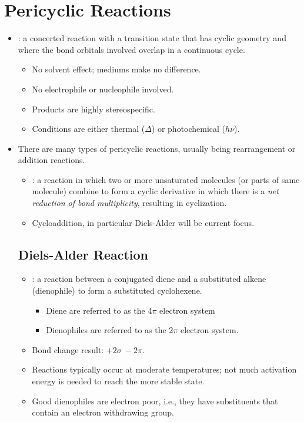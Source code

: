 \section{Pericyclic Reactions}\label{Pericyclic Reactions}
\begin{itemize}
  \item {}: a concerted reaction with a transition state that has cyclic geometry and where the bond orbitals involved overlap in a continuous cycle.
    \begin{itemize}
      \item No solvent effect; mediums make no difference.
      \item No electrophile or nucleophile involved.
      \item Products are highly stereospecific.
      \item Conditions are either thermal (\(\Delta \)) or photochemical (\(h\nu \)).
    \end{itemize}
  \item There are many types of pericyclic reactions, usually being rearrangement or addition reactions. 
    \begin{itemize}
      \item {}: a reaction in which two or more unsaturated molecules (or parts of same molecule) combine to form a cyclic derivative in which there is a \emph{net reduction of bond multiplicity}, resulting in cyclization. 
      \item Cycloaddition, in particular Diels-Alder will be current focus.
    \end{itemize}
  
  \subsection{Diels-Alder Reaction}\label{Diels-Alder Reaction}
  \begin{itemize}
      \item {}: a reaction between a conjugated diene and a substituted alkene (dienophile) to form a substituted cyclohexene. 
        \begin{itemize}
          \item Diene are referred to as the 4\(\pi \) electron system
          \item Dienophiles are referred to as the 2\(\pi \) electron system.
        \end{itemize}
      \item Bond change result: \(+2 \sigma ~ -2 \pi \).
      \item Reactions typically occur at moderate temperatures; not much activation energy is needed to reach the more stable state.
      \item Good dienophiles are electron poor, i.e., they have substituents that contain an electron withdrawing group.
  \end{itemize}
    
\end{itemize}

